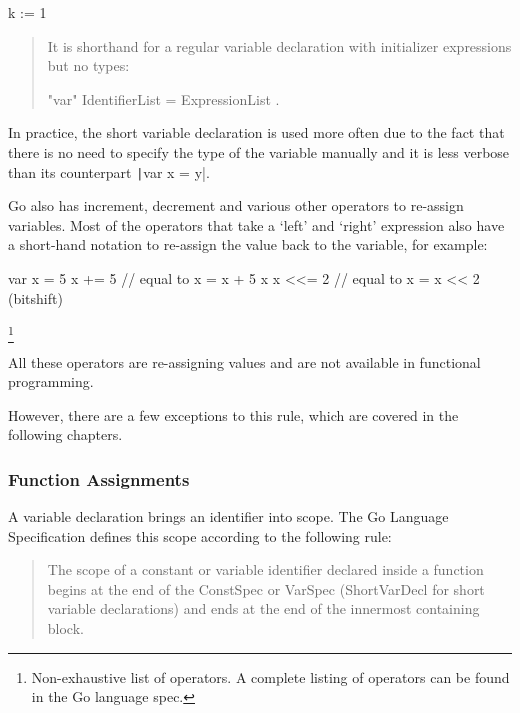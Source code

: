\begin{gocode}
    k := 1
\end{gocode}

\begin{quote}
    It is shorthand for a regular variable declaration with initializer expressions but no types:

    \begin{bnfcode}
"var" IdentifierList = ExpressionList .
    \end{bnfcode}
\end{quote}\autocite{short-hand-decl}

In practice, the short variable declaration is used more often due to the
fact that there is no need to specify the type of the variable manually and
it is less verbose than its counterpart \texttt|var x = y|.

Go also has increment, decrement and various other operators to re-assign
variables. Most of the operators that take a `left' and `right' expression
also have a short-hand notation to re-assign the value back to the variable,
for example:

\begin{code}
\begin{gocode}
    var x = 5
    x += 5 // equal to x = x + 5
    x %
    x <<= 2 // equal to x = x << 2 (bitshift)
\end{gocode}
\end{code}\footnote{Non-exhaustive list of operators. A complete listing
of operators can be found in the Go language spec\autocite{spec-operators}.}

All these operators are re-assigning values and are not available in functional
programming.

However, there are a few exceptions to this rule, which are covered in the
following chapters.

\subsubsection{Function Assignments}

A variable declaration brings an identifier into scope. The Go Language Specification
defines this scope according to the following rule:
\begin{quote}
    The scope of a constant or variable identifier declared inside a function begins
    at the end of the ConstSpec or VarSpec (ShortVarDecl for short variable
    declarations) and ends at the end of the innermost containing block.
\autocite{spec-scope}\end{quote}

